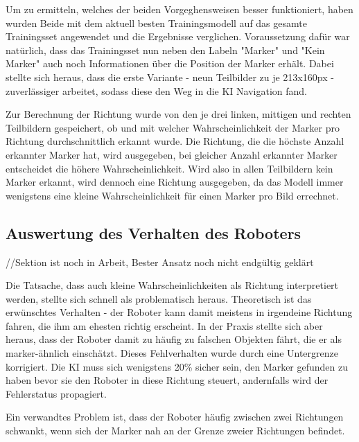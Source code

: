 \documentclass[conference]{IEEEtran}
\begin{document}

Um zu ermitteln, welches der beiden Vorgeghensweisen besser funktioniert, 
haben wurden Beide mit dem aktuell besten Trainingsmodell auf das 
gesamte Trainingsset angewendet und die Ergebnisse verglichen.
Voraussetzung dafür war natürlich, dass das Trainingsset nun neben den Labeln "Marker" und "Kein Marker" auch noch Informationen über die Position der Marker erhält.
Dabei stellte sich heraus, dass die erste Variante - neun Teilbilder zu je 213x160px - zuverlässiger arbeitet, sodass diese den Weg in die KI Navigation fand.


Zur Berechnung der Richtung wurde von den je drei linken, mittigen und rechten Teilbildern gespeichert, ob und mit welcher Wahrscheinlichkeit der Marker pro Richtung durchschnittlich erkannt wurde.
Die Richtung, die die höchste Anzahl erkannter Marker hat, wird ausgegeben, bei gleicher Anzahl erkannter Marker entscheidet die höhere Wahrscheinlichkeit.
Wird also in allen Teilbildern kein Marker erkannt, wird dennoch eine Richtung ausgegeben, da das Modell immer wenigstens eine kleine Wahrscheinlichkeit für einen Marker pro Bild errechnet.


\subsection {Auswertung des Verhalten des Roboters}	%
//Sektion ist noch in Arbeit, Bester Ansatz noch nicht endgültig geklärt

Die Tatsache, dass auch kleine Wahrscheinlichkeiten als Richtung interpretiert werden, stellte sich schnell als problematisch heraus.
Theoretisch ist das erwünschtes Verhalten - der Roboter kann damit meistens in irgendeine Richtung fahren, die ihm am ehesten richtig erscheint.
In der Praxis stellte sich aber heraus, dass der Roboter damit zu häufig zu falschen Objekten fährt, die er als marker-ähnlich einschätzt. Dieses Fehlverhalten wurde durch eine Untergrenze korrigiert. Die KI muss sich wenigstens 20\% sicher sein, den Marker gefunden zu haben bevor sie den Roboter in diese Richtung steuert, andernfalls wird der Fehlerstatus propagiert.

Ein verwandtes Problem ist, dass der Roboter häufig zwischen zwei Richtungen schwankt, wenn sich der Marker nah an der Grenze zweier Richtungen befindet.
\end{document}
